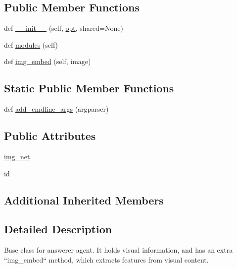 \subsection*{Public Member Functions}
\begin{DoxyCompactItemize}
\item 
def \hyperlink{classtaskntalk_1_1coopgame__agent_1_1AnswererAgent_af3e7459c883eb14adcab9f96a7e31565}{\+\_\+\+\_\+init\+\_\+\+\_\+} (self, \hyperlink{classparlai_1_1core_1_1agents_1_1Agent_ab3b45d2754244608c75d4068b90cd051}{opt}, shared=None)
\item 
def \hyperlink{classtaskntalk_1_1coopgame__agent_1_1AnswererAgent_a644b0248b9379ad817a07cd61b4f9bc3}{modules} (self)
\item 
def \hyperlink{classtaskntalk_1_1coopgame__agent_1_1AnswererAgent_aeb7931b0d9776e491b4ea5cc5979680e}{img\+\_\+embed} (self, image)
\end{DoxyCompactItemize}
\subsection*{Static Public Member Functions}
\begin{DoxyCompactItemize}
\item 
def \hyperlink{classtaskntalk_1_1coopgame__agent_1_1AnswererAgent_ab6305fe5caee79398eadb4b2c3cbfaec}{add\+\_\+cmdline\+\_\+args} (argparser)
\end{DoxyCompactItemize}
\subsection*{Public Attributes}
\begin{DoxyCompactItemize}
\item 
\hyperlink{classtaskntalk_1_1coopgame__agent_1_1AnswererAgent_ace4615b6098d316db88536685aa46487}{img\+\_\+net}
\item 
\hyperlink{classtaskntalk_1_1coopgame__agent_1_1AnswererAgent_a3396232d3c8bf7d42173afdae93c2728}{id}
\end{DoxyCompactItemize}
\subsection*{Additional Inherited Members}


\subsection{Detailed Description}
\begin{DoxyVerb}Base class for answerer agent. It holds visual information, and has an
extra  ``img_embed`` method, which extracts features from visual content.
\end{DoxyVerb}
 

